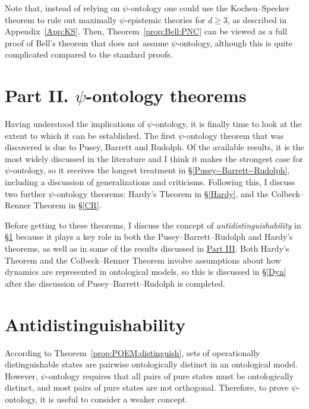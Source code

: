 \documentclass[DIV=calc,paper=a4,fontsize=11pt,twocolumn]{scrartcl} %
\theoremstyle{definition}
\theoremstyle{plain}
\begin{document}
Note that, instead of relying on $\psi$-ontology one could use the
Kochen--Specker theorem to rule out maximally $\psi$-epistemic theories
for $d \geq 3$, as described in Appendix~\ref{App:KS}.  Then,
Theorem~\ref{prop:Bell:PNC} can be viewed as a full proof of Bell's
theorem that does not assume $\psi$-ontology, although this is quite
complicated compared to the standard proofs.

\section*{Part II. $\psi$-ontology theorems\label{SPON}}

Having understood the implications of $\psi$-ontology, it is finally
time to look at the extent to which it can be established.  The first
$\psi$-ontology theorem that was discovered is due to Pusey, Barrett
and Rudolph. Of the available results, it is the most widely discussed
in the literature and I think it makes the strongest case for
$\psi$-ontology, so it receives the longest treatment in
\S\ref{Pusey--Barrett--Rudolph}, including a discussion of
generalizations and criticisms.  Following this, I discuss two further
$\psi$-ontology theorems: Hardy's Theorem in \S\ref{Hardy}, and the
Colbeck--Renner Theorem in \S\ref{CR}.

Before getting to these theorems, I discuss the concept of
\emph{antidistinguishability} in \S\ref{Anti} because it plays a key
role in both the Pusey--Barrett--Rudolph and Hardy's theorems, as well as in some
of the results discussed in \hyperref[Beyond]{Part III}. Both Hardy's Theorem and the Colbeck--Renner Theorem involve assumptions about how dynamics
are represented in ontological models, so this is discussed in
\S\ref{Dyn} after the discussion of Pusey--Barrett--Rudolph is completed.

\section{Antidistinguishability}

\label{Anti}

According to Theorem~\ref{prop:POEM:distinguish}, sets of
operationally distinguishable states are pairwise ontologically
distinct in an ontological model.  However, $\psi$-ontology requires
that all pairs of pure states must be ontologically distinct, and most
pairs of pure states are not orthogonal.  Therefore, to prove
$\psi$-ontology, it is useful to consider a weaker concept.
\end{document}
